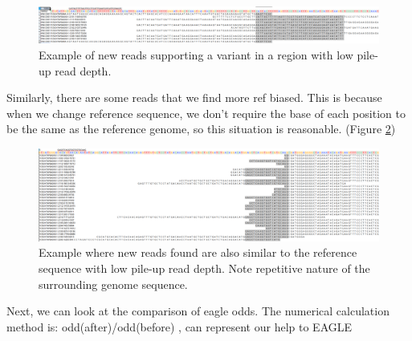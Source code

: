 \vspace{1cm}
\begin{figure}[H]
    \centering
    \includegraphics[width=1\columnwidth]{body/image/4-3.png}
    \captionsetup{labelfont=bf}
    \renewcommand{\baselinestretch}{1.0}
    \vspace{-1cm}
    \caption[New reads in a region with low pile-up read depth]{Example of new reads supporting a variant in a region with low pile-up read depth.}
    \label{f4-3}
\end{figure}

Similarly, there are some reads that we find more ref biased. This is because when we change reference sequence, we don't require the base of each position to be the same as the reference genome, so this situation is reasonable. (Figure \ref{f4-4})

\vspace{1cm}
\begin{figure}[H]
    \centering
    \includegraphics[width=1\columnwidth]{body/image/4-4.png}
    \captionsetup{labelfont=bf}
    \renewcommand{\baselinestretch}{1.0}
    \vspace{-1cm}
    \caption[New reads are similar to the reference with low pile-up read depth]{Example where new reads found are also similar to the reference sequence with low pile-up read depth.  Note repetitive nature of the surrounding genome sequence.}
    \label{f4-4}
\end{figure}

Next, we can look at the comparison of eagle odds. 
The numerical calculation method is:
odd(after)/odd(before)
, can represent our help to EAGLE


